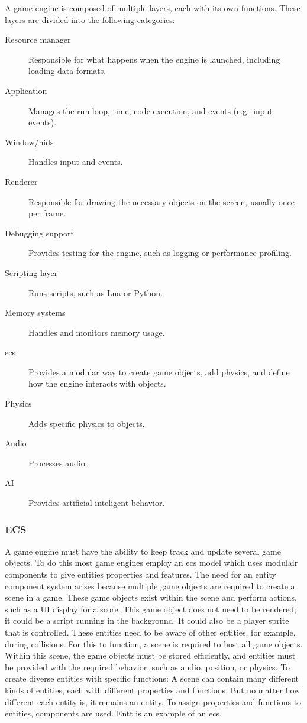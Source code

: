 \documentclass{projdoc}
\begin{document}
A game engine is composed of multiple layers, each with its own functions. These
layers are divided into the following categories:\noparbreak
\begin{description}
	\item[Resource manager] Responsible for what happens when the engine is launched,
		including loading data formats.
	\item[Application] Manages the run loop, time, code execution, and events
		(e.g.~input events).
	\item[Window/\glspl{hid}] Handles input and events.
	\item[Renderer] Responsible for drawing the necessary objects on the screen,
		usually once per frame.
	\item[Debugging support] Provides testing for the engine, such as logging or
		performance profiling.
	\item[Scripting layer] Runs scripts, such as Lua or Python.
	\item[Memory systems] Handles and monitors memory usage.
	\item[\gls{ecs}] Provides a modular way to create game objects, add physics, and
		define how the engine interacts with objects.
	\item[Physics] Adds specific physics to objects.
	\item[Audio] Processes audio.
	\item[AI] Provides artificial inteligent behavior.
\end{description}

\subsubsection{ECS}

A game engine must have the ability to keep track and update several game objects. To
do this most game engines employ an \gls{ecs} model which uses modulair components to
give entities properties and features. The need for an entity component system arises
because multiple game objects are required to create a scene in a game. These game
objects exist within the scene and perform actions, such as a UI display for a score.
This game object does not need to be rendered; it could be a script running in the
background. It could also be a player sprite that is controlled. These entities need
to be aware of other entities, for example, during collisions. For this to function,
a scene is required to host all game objects. Within this scene, the game objects
must be stored efficiently, and entities must be provided with the required behavior,
such as audio, position, or physics. To create diverse entities with specific
functions: A scene can contain many different kinds of entities, each with different
properties and functions. But no matter how different each entity is, it remains an
entity. To assign properties and functions to entities, components are used. Entt is
an example of an \gls{ecs}.
\end{document}

